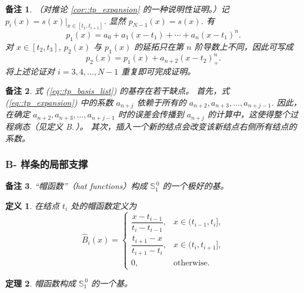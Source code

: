 \documentclass[a4paper]{ctexart}
\newtheorem{theorem}{定理}
\newtheorem{remark}{备注}
\newtheorem{definition}[theorem]{定义} %
\numberwithin{theorem}{section}
\numberwithin{equation}{section}
\numberwithin{figure}{section}
\numberwithin{remark}{section}
\begin{document}
\begin{remark}
    \label{rem::proof_cor_tp}
（对推论 \ref{cor::tp_expansion} 的一种说明性证明。）记
$p_i(x)=s(x)\big|_{x\in[t_1,t_{i+1}]}$. 显然 $p_{N-1}(x)=s(x)$. 有
\[
p_1(x)=a_0+a_1(x-t_1)+\cdots+a_n(x-t_1)^n.
\]
对 $x\in[t_2,t_3]$, $p_2(x)$ 与 $p_1(x)$ 的延拓只在第 $n$ 阶导数上不同，因此可写成
\[
p_2(x)=p_1(x)+a_{n+2}(x-t_2)_{+}^{n}.
\]
将上述论证对 $i=3,4,\ldots,N-1$ 重复即可完成证明。
\end{remark}

\begin{remark}
    \label{rem::tp_drawbacks}
式 (\ref{eq::tp_basis_list}) 的基存在若干缺点。
首先，式 (\ref{eq::tp_expansion}) 中的系数 $a_{n+j}$ 依赖于所有的 $a_{n+2},a_{n+3},\ldots,a_{n+j-1}$. 
因此，在确定 $a_{n+2},a_{n+3},\ldots,a_{n+j-1}$ 时的误差会传播到 $a_{n+j}$ 的计算中，这使得整个过程病态（见定义 B.\,）。
其次，插入一个新的结点会改变该新结点右侧所有结点的系数。
\end{remark}

\subsubsection{B- 样条的局部支撑}
\label{subsec::local_support_bspline}

\begin{remark}
    \label{rem::hat_good_basis}
“帽函数”（hat functions）构成 $\mathbb{S}^{\,0}_{1}$ 的一个极好的基。
\end{remark}

\begin{definition}
    \label{def::hat_function}
在结点 $t_i$ 处的帽函数定义为
\begin{equation}
    \label{eq::hat_function}
\hat{B}_i(x)=
\begin{cases}
\dfrac{x-t_{i-1}}{t_i-t_{i-1}}, & x\in(t_{i-1},t_i],\\[6pt]
\dfrac{t_{i+1}-x}{t_{i+1}-t_i}, & x\in(t_i,t_{i+1}],\\[6pt]
0, & \text{otherwise}.
\end{cases}
\end{equation}
\end{definition}

\begin{theorem}
    \label{thm::hat_form_basis}
帽函数构成 $\mathbb{S}^{\,0}_{1}$ 的一个基。
\end{theorem}
\end{document}
